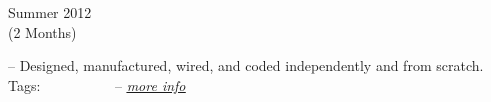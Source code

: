 \divLine

\flushleft \begin{minipage}[t]{\dateColWidth}
Summer 2012 \\
(2 Months)
\end{minipage}
\begin{minipage}[t]{0.8\textwidth}
	--
	Designed, manufactured, wired, and coded independently and from scratch.
	\\[0.2 em]
	Tags: 
	 \vline\ 
	 \vline\ 
	 \vline\ 
	 \vline\ 
	 \vline\ 
	 \vline\ 
	--
	\href{http://www.claytonketner.com/robotic-arm-mk2/}{\uline{\textit{more info}}}
\end{minipage}